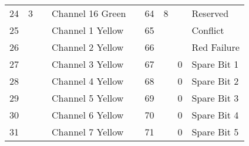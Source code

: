 \documentclass[]{article}
\begin{document}
\begin{landscape}
\begin{table}[]
\begin{tabular}{lllllllll}
			24                       & \multirow{-8}{*}{3}      & \multirow{-8}{*}{}       & Channel 16 Green               &                    & 64                                                    & \multirow{-8}{*}{8}  & \multirow{-8}{*}{} & Reserved                                          \\ \cline{1-4} \cline{6-9} 
			25                       &                          &                          & Channel 1 Yellow               &                    & 65                                                    &                      &                    & Conflict                                          \\
			26                       &                          &                          & Channel 2 Yellow               &                    & 66                                                    &                      &                    & Red Failure                                       \\ \cline{8-9} 
			27                       &                          &                          & Channel 3 Yellow               &                    & 67                                                    &                      & 0                  & Spare Bit 1                                       \\
			28                       &                          &                          & Channel 4 Yellow               &                    & 68                                                    &                      & 0                  & Spare Bit 2                                       \\
			29                       &                          &                          & Channel 5 Yellow               &                    & 69                                                    &                      & 0                  & Spare Bit 3                                       \\
			30                       &                          &                          & Channel 6 Yellow               &                    & 70                                                    &                      & 0                  & Spare Bit 4                                       \\
			31                       &                          &                          & Channel 7 Yellow               &                    & 71                                                    &                      & 0                  & Spare Bit 5                                       \\

\end{tabular}
\end{table}
\end{landscape}
\end{document}
